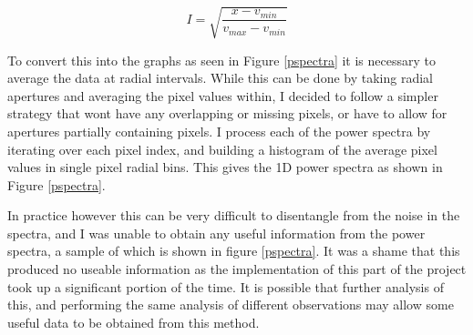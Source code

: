 \begin{equation}
    I = \sqrt{\frac{x - v_{min}}{v_{max}-v_{min}}}
    \label{spec-scale}
\end{equation}

 To convert this into the graphs as seen in Figure \ref{pspectra} it is necessary to average the data at radial intervals. While this can be done by taking radial apertures and averaging the pixel values within, I decided to follow a simpler strategy that wont have any overlapping or missing pixels, or have to allow for apertures partially containing pixels. I process each of the power spectra by iterating over each pixel index, and building a histogram of the average pixel values in single pixel radial bins. This gives the 1D power spectra as shown in Figure \ref{pspectra}.

In practice however this can be very difficult to disentangle from the noise in the spectra, and I was unable to obtain any useful information from the power spectra, a sample of which is shown in figure \ref{pspectra}. It was a shame that this produced no useable information as the implementation of this part of the project took up a significant portion of the time. It is possible that further analysis of this, and performing the same analysis of different observations may allow some useful data to be obtained from this method.
